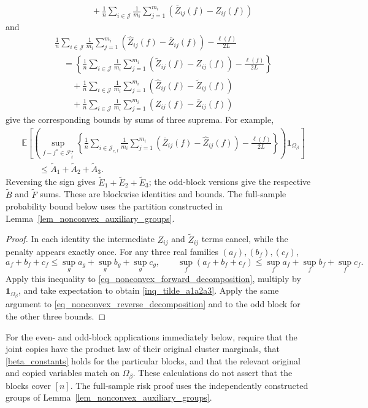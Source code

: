 \documentclass[twoside,11pt]{article}
\newenvironment{revision}{\color{revisionred}}{}
\begin{document}
\begin{revision}
\begin{theorem}
\begin{equation}
\begin{aligned}
&\qquad+\frac1n\sum_{i\in\mathcal J}\frac1{m_i}\sum_{j=1}^{m_i}
 (\bar Z_{ij}(f)-Z_{ij}(f))
\end{aligned}
\end{equation}
and
\begin{equation}
\label{eq_nonconvex_reverse_decomposition}
\begin{aligned}
&\frac1n\sum_{i\in\mathcal J}\frac1{m_i}\sum_{j=1}^{m_i}
 (\hat Z_{ij}(f)-\bar Z_{ij}(f))-\frac{\ell(f)}{2L}\\
&\quad=\left\{\frac1n\sum_{i\in\mathcal J}\frac1{m_i}\sum_{j=1}^{m_i}
 (\tilde Z_{ij}(f)-Z_{ij}(f))-\frac{\ell(f)}{2L}\right\}\\
&\qquad+\frac1n\sum_{i\in\mathcal J}\frac1{m_i}\sum_{j=1}^{m_i}
 (\hat Z_{ij}(f)-\tilde Z_{ij}(f))\\
&\qquad+\frac1n\sum_{i\in\mathcal J}\frac1{m_i}\sum_{j=1}^{m_i}
 (Z_{ij}(f)-\bar Z_{ij}(f))
\end{aligned}
\end{equation}
give the corresponding bounds by sums of three suprema.
For example,
\begin{equation}
\label{inq_tilde_a1a2a3}
\begin{aligned}
&\mathbb E\left[\left(
\sup_{f-f^*\in\mathcal F_{\tilde t}^{\star}}
\left\{\frac1n\sum_{i\in\mathcal J_{e,l}}\frac1{m_i}\sum_{j=1}^{m_i}
 (\bar Z_{ij}(f)-\hat Z_{ij}(f))-\frac{\ell(f)}{2L}\right\}
\right)\mathbf1_{\Omega_\beta}\right]\\
&\qquad\leq\tilde A_1+\tilde A_2+\tilde A_3.
\end{aligned}
\end{equation}
Reversing the sign gives $\tilde E_1+\tilde E_2+\tilde E_3$;
the odd-block versions give the respective $\tilde B$ and $\tilde F$
sums. These are blockwise identities and bounds. The full-sample
probability bound below uses the partition constructed in
Lemma~\ref{lem_nonconvex_auxiliary_groups}.
\end{theorem}
\begin{proof}
In each identity the intermediate $Z_{ij}$ and $\tilde Z_{ij}$
terms cancel, while the penalty appears exactly once.
For any three real families $(a_f),(b_f),(c_f)$,
\[
a_f+b_f+c_f\leq\sup_g a_g+\sup_g b_g+\sup_g c_g,
\qquad
\sup_f(a_f+b_f+c_f)\leq\sup_f a_f+\sup_f b_f+\sup_f c_f.
\]
Apply this inequality to \eqref{eq_nonconvex_forward_decomposition},
multiply by $\mathbf1_{\Omega_\beta}$, and take expectation to obtain
\eqref{inq_tilde_a1a2a3}. Apply the same argument to
\eqref{eq_nonconvex_reverse_decomposition} and to the odd block
for the other three bounds.
\end{proof}
For the even- and odd-block applications immediately below, require
that the joint copies have the product law of their original
cluster marginals, that \eqref{beta_constants} holds for the
particular blocks, and that the relevant original and copied
variables match on $\Omega_\beta$. These calculations do not
assert that the blocks cover $[n]$. The full-sample risk proof
uses the independently constructed groups of
Lemma~\ref{lem_nonconvex_auxiliary_groups}.
\end{revision}
\end{document}
